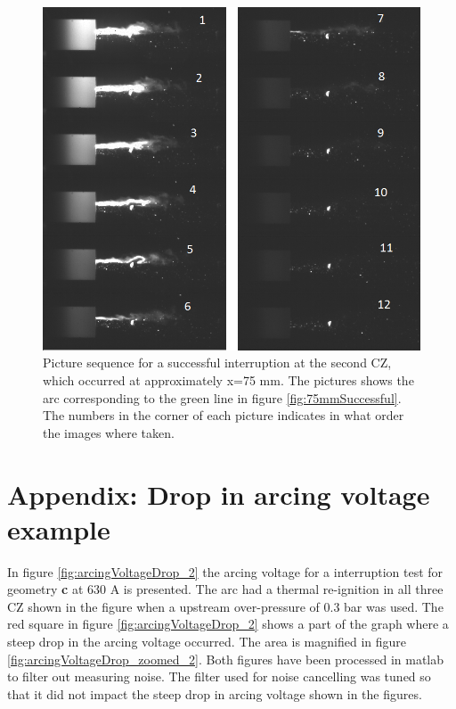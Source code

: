 \documentclass[10pt,b5paper,twoside]{article}
\begin{document}
\begin{figure}[H]
\centering
\includegraphics[scale=0.7, angle =0 ]{Bilder/Results/126_75_TR_OK.png}
\caption{Picture sequence for a successful interruption at the second CZ, which occurred at approximately x=75 mm. The pictures shows the arc corresponding to the green line in figure \ref{fig:75mmSuccessful}. The numbers in the corner of each picture indicates in what order the images where taken.} \label{fig:arcingVoltage_test_114_green_OK}
\end{figure}

\cleardoublepage

\section{Appendix: Drop in arcing voltage example} \label{app:DROP_ImageSequences}
\setcounter{figure}{0}
\setcounter{table}{0}
\makeatletter 
\renewcommand{\thefigure}{C.\@arabic\c@figure}
\makeatother

\makeatletter 
\renewcommand{\thetable}{C.\@arabic\c@table}
\makeatother

In figure \ref{fig:arcingVoltageDrop_2} the arcing voltage for a interruption test for geometry \textbf{c} at 630 A is presented. The arc had a thermal re-ignition in all three CZ shown in the figure when a upstream over-pressure of 0.3 bar was used. The red square in figure \ref{fig:arcingVoltageDrop_2} shows a part of the graph where a steep drop in the arcing voltage occurred. The area is magnified in figure \ref{fig:arcingVoltageDrop_zoomed_2}. Both figures have been processed in matlab to filter out measuring noise. The filter used for noise cancelling was tuned so that it did not impact the steep drop in arcing voltage shown in the figures.
\end{document}
